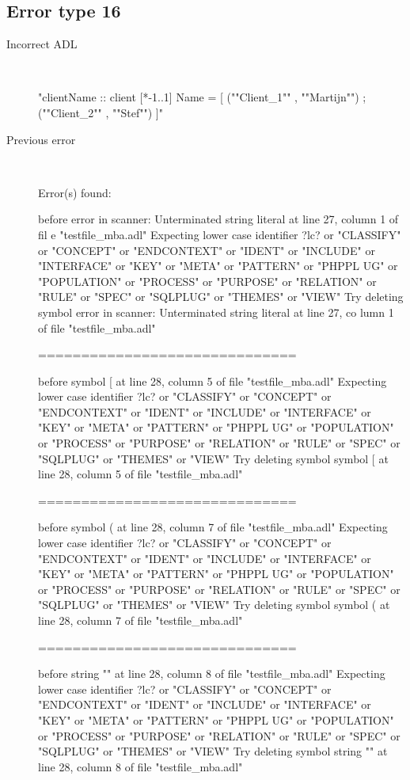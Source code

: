\hrulefill

\subsection{Error type 16}
  \begin{description}
  \item[Incorrect ADL]~\\
\begin{adl}
"clientName :: client [*-1..1] Name =
    [ (""Client_1""      , ""Martijn"")
    ; (""Client_2""      , ""Stef"")
    ]"\end{adl}
  \item[Previous error]~\\
\begin{haskell}
Error(s) found:

before error in scanner: Unterminated string literal at line 27, column 1 of fil
e "testfile_mba.adl"
Expecting lower case identifier ?lc? or "CLASSIFY" or "CONCEPT" or "ENDCONTEXT"
or "IDENT" or "INCLUDE" or "INTERFACE" or "KEY" or "META" or "PATTERN" or "PHPPL
UG" or "POPULATION" or "PROCESS" or "PURPOSE" or "RELATION" or "RULE" or "SPEC"
or "SQLPLUG" or "THEMES" or "VIEW"
Try deleting symbol error in scanner: Unterminated string literal at line 27, co
lumn 1 of file "testfile_mba.adl"

==============================

before symbol [ at line 28, column 5 of file "testfile_mba.adl"
Expecting lower case identifier ?lc? or "CLASSIFY" or "CONCEPT" or "ENDCONTEXT"
or "IDENT" or "INCLUDE" or "INTERFACE" or "KEY" or "META" or "PATTERN" or "PHPPL
UG" or "POPULATION" or "PROCESS" or "PURPOSE" or "RELATION" or "RULE" or "SPEC"
or "SQLPLUG" or "THEMES" or "VIEW"
Try deleting symbol symbol [ at line 28, column 5 of file "testfile_mba.adl"

==============================

before symbol ( at line 28, column 7 of file "testfile_mba.adl"
Expecting lower case identifier ?lc? or "CLASSIFY" or "CONCEPT" or "ENDCONTEXT"
or "IDENT" or "INCLUDE" or "INTERFACE" or "KEY" or "META" or "PATTERN" or "PHPPL
UG" or "POPULATION" or "PROCESS" or "PURPOSE" or "RELATION" or "RULE" or "SPEC"
or "SQLPLUG" or "THEMES" or "VIEW"
Try deleting symbol symbol ( at line 28, column 7 of file "testfile_mba.adl"

==============================

before string "" at line 28, column 8 of file "testfile_mba.adl"
Expecting lower case identifier ?lc? or "CLASSIFY" or "CONCEPT" or "ENDCONTEXT"
or "IDENT" or "INCLUDE" or "INTERFACE" or "KEY" or "META" or "PATTERN" or "PHPPL
UG" or "POPULATION" or "PROCESS" or "PURPOSE" or "RELATION" or "RULE" or "SPEC"
or "SQLPLUG" or "THEMES" or "VIEW"
Try deleting symbol string "" at line 28, column 8 of file "testfile_mba.adl"


\end{haskell}
\end{description}
